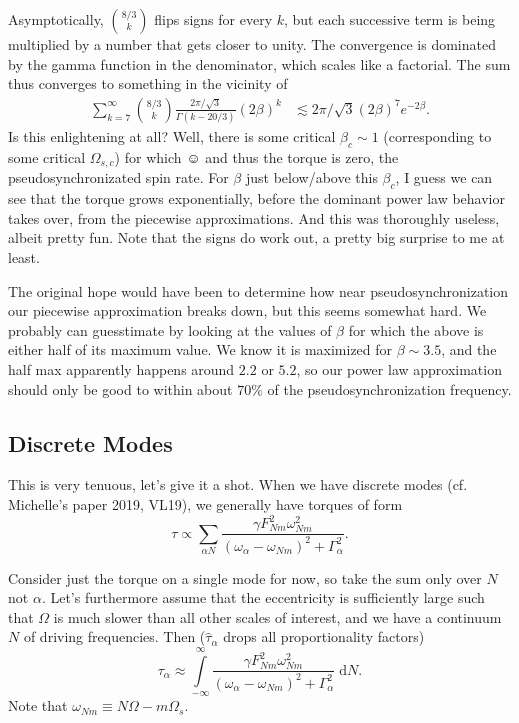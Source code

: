 \documentclass[11pt,
        usenames, %
        dvipsnames %
    ]{article}
\newcommand*{\p}[1]{\left(#1\right)}
\begin{document}
Asymptotically, $\binom{8/3}{k}$ flips signs for every $k$, but each successive
term is being multiplied by a number that gets closer to unity. The convergence
is dominated by the gamma function in the denominator, which scales like a
factorial. The sum thus converges to something in the vicinity of
\begin{align}
    \sum\limits_{k = 7}^\infty \binom{8/3}{k}
            \frac{2\pi/\sqrt{3}}{\Gamma\p{k - 20/3}}\p{2\beta}^k
        &\lesssim 2\pi/\sqrt{3}(2\beta)^7 e^{-2\beta}.
\end{align}
Is this enlightening at all? Well, there is some critical $\beta_c \sim 1$
(corresponding to some critical $\Omega_{s,c}$) for which $\smiley$ and thus the
torque is zero, the pseudosynchronizated spin rate. For $\beta$ just below/above
this $\beta_c$, I guess we can see that the torque grows exponentially, before
the dominant power law behavior takes over, from the piecewise approximations.
And this was thoroughly useless, albeit pretty fun. Note that the signs do work
out, a pretty big surprise to me at least.

The original hope would have been to determine how near pseudosynchronization
our piecewise approximation breaks down, but this seems somewhat hard. We
probably can guesstimate by looking at the values of $\beta$ for which the above
is either half of its maximum value. We know it is maximized for $\beta \sim
3.5$, and the half max apparently happens around $2.2$ or $5.2$, so our power
law approximation should only be good to within about $70\%$ of the
pseudosynchronization frequency.

\subsection{Discrete Modes}

This is very tenuous, let's give it a shot. When we have discrete modes (cf.
Michelle's paper 2019, VL19), we generally have torques of form
\begin{equation}
    \tau \propto \sum\limits_{\alpha N}
        \frac{\gamma F_{Nm}^2 \omega_{Nm}^2}{
            \p{\omega_\alpha - \omega_{Nm}}^2 + \Gamma_\alpha^2}.
\end{equation}

Consider just the torque on a single mode for now, so take the sum only over $N$
not $\alpha$. Let's furthermore assume that the eccentricity is sufficiently
large such that $\Omega$ is much slower than all other scales of interest, and
we have a continuum $N$ of driving frequencies. Then ($\hat{\tau}_\alpha$ drops
all proportionality factors)
\begin{equation}
    \tau_\alpha \approx \int\limits_{-\infty}^\infty
        \frac{\gamma F_{Nm}^2 \omega_{Nm}^2}{
            \p{\omega_\alpha - \omega_{Nm}}^2 + \Gamma_\alpha^2}\;\mathrm{d}N.
\end{equation}
Note that $\omega_{Nm} \equiv N\Omega - m\Omega_s$.
\end{document}
